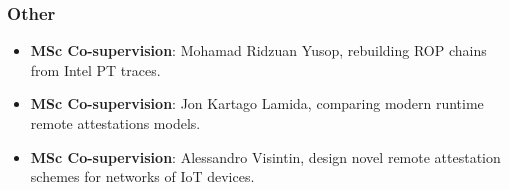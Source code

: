 \documentclass[a4paper, 10pt]{article}
\begin{document}
\subsubsection*{Other}
\vspace{-0.3em}
\begin{itemize}
  \setlength{\itemsep}{1pt}
  \setlength{\parskip}{0pt}
  \setlength{\parsep}{0pt}

\item {\bf MSc Co-supervision}: Mohamad Ridzuan Yusop, rebuilding ROP chains 
from Intel PT traces.
\item {\bf MSc Co-supervision}: Jon Kartago Lamida, comparing modern runtime 
remote attestations models. 
\item {\bf MSc Co-supervision}: Alessandro Visintin, design novel remote 
attestation schemes for networks of IoT devices.
\end{itemize}



\end{document}
